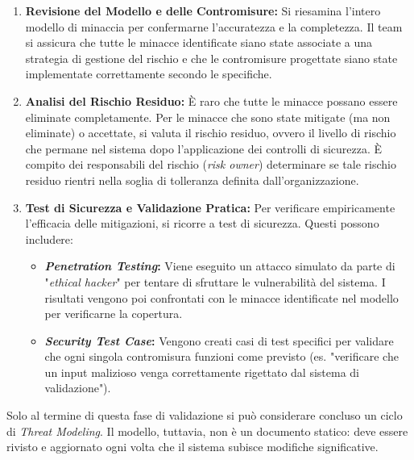 \begin{enumerate}
    \item \textbf{Revisione del Modello e delle Contromisure:}
    Si riesamina l'intero modello di minaccia per confermarne l'accuratezza e la completezza. Il team si assicura che tutte le minacce identificate siano state associate a una strategia di gestione del rischio e che le contromisure progettate siano state implementate correttamente secondo le specifiche.
    \item \textbf{Analisi del Rischio Residuo:}
    È raro che tutte le minacce possano essere eliminate completamente. Per le minacce che sono state mitigate (ma non eliminate) o accettate, si valuta il rischio residuo, ovvero il livello di rischio che permane nel sistema dopo l'applicazione dei controlli di sicurezza. È compito dei responsabili del rischio (\textit{risk owner}) determinare se tale rischio residuo rientri nella soglia di tolleranza definita dall'organizzazione.
    \item \textbf{Test di Sicurezza e Validazione Pratica:}
    Per verificare empiricamente l'efficacia delle mitigazioni, si ricorre a test di sicurezza. Questi possono includere:
    \begin{itemize}
        \item \textbf{\textit{Penetration Testing}:} Viene eseguito un attacco simulato da parte di "\textit{ethical hacker}" per tentare di sfruttare le vulnerabilità del sistema. I risultati vengono poi confrontati con le minacce identificate nel modello per verificarne la copertura.
        \item \textbf{\textit{Security Test Case}:} Vengono creati casi di test specifici per validare che ogni singola contromisura funzioni come previsto (es. "verificare che un input malizioso venga correttamente rigettato dal sistema di validazione").
    \end{itemize}
\end{enumerate}

Solo al termine di questa fase di validazione si può considerare concluso un ciclo di \textit{Threat Modeling}. Il modello, tuttavia, non è un documento statico: deve essere rivisto e aggiornato ogni volta che il sistema subisce modifiche significative.


